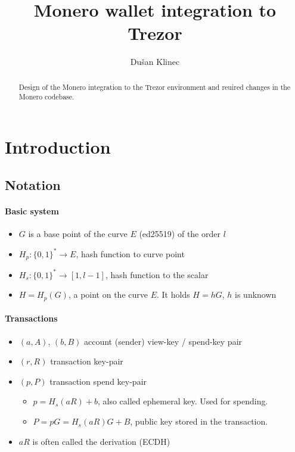 \documentclass[]{article}
\title{Monero wallet integration to Trezor}
\author{Du\v{s}an Klinec}
\begin{document}
\maketitle

\begin{abstract}
Design of the Monero integration to the Trezor environment and reuired changes in the Monero codebase.
\end{abstract}

\section{Introduction}

\subsection{Notation}

\paragraph{Basic system}

\begin{itemize}
	\item $G$ is a base point of the curve $E$ (ed25519) of the order $l$
	\item $H_p : \{0,1\}^* \rightarrow E$, hash function to curve point
	\item $H_s : \{0,1\}^* \rightarrow [1, l-1]$, hash function to the scalar
	\item $H = H_p(G)$, a point on the curve $E$. It holds $H=hG$, $h$ is unknown
	
\end{itemize}

\paragraph{Transactions}

\begin{itemize}
	\item $(a, A)$, $(b, B)$ account (sender) view-key / spend-key pair
	\item $(r, R)$ transaction key-pair 
	\item $(p, P)$ transaction spend key-pair
	\begin{itemize}
		\item $p = H_s(aR) + b$, also called ephemeral key. Used for spending.
		\item $P = pG = H_s(aR)G + B$, public key stored in the transaction.
	\end{itemize}
	\item $aR$ is often called the derivation (ECDH)
\end{itemize}
\end{document}
